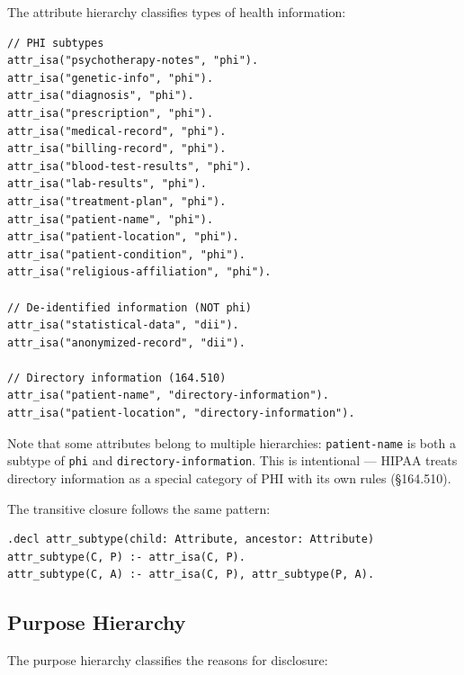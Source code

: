 \documentclass[11pt,letterpaper]{article}
\begin{document}
The attribute hierarchy classifies types of health information:

\begin{lstlisting}[style=soufflestyle,caption={Attribute hierarchy (selected entries)}]
// PHI subtypes
attr_isa("psychotherapy-notes", "phi").
attr_isa("genetic-info", "phi").
attr_isa("diagnosis", "phi").
attr_isa("prescription", "phi").
attr_isa("medical-record", "phi").
attr_isa("billing-record", "phi").
attr_isa("blood-test-results", "phi").
attr_isa("lab-results", "phi").
attr_isa("treatment-plan", "phi").
attr_isa("patient-name", "phi").
attr_isa("patient-location", "phi").
attr_isa("patient-condition", "phi").
attr_isa("religious-affiliation", "phi").

// De-identified information (NOT phi)
attr_isa("statistical-data", "dii").
attr_isa("anonymized-record", "dii").

// Directory information (164.510)
attr_isa("patient-name", "directory-information").
attr_isa("patient-location", "directory-information").
\end{lstlisting}

Note that some attributes belong to multiple hierarchies: \texttt{patient-name} is both a subtype of \texttt{phi} and \texttt{directory-information}. This is intentional --- HIPAA treats directory information as a special category of PHI with its own rules (\S 164.510).

The transitive closure follows the same pattern:
\begin{lstlisting}[style=soufflestyle]
.decl attr_subtype(child: Attribute, ancestor: Attribute)
attr_subtype(C, P) :- attr_isa(C, P).
attr_subtype(C, A) :- attr_isa(C, P), attr_subtype(P, A).
\end{lstlisting}

\subsection{Purpose Hierarchy}

The purpose hierarchy classifies the reasons for disclosure:
\end{document}
